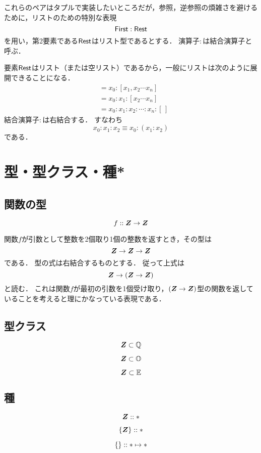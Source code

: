 \documentclass[twocolumn]{jsbook}
\begin{document}
これらのペアはタプルで実装したいところだが，参照，逆参照の煩雑さを避けるために，リストのための特別な表現$$\textsf{First}:\textsf{Rest}$$を用い，第2要素である$\textsf{Rest}$はリスト型であるとする．
演算子$:$は結合演算子と呼ぶ．

要素$\textsf{Rest}$はリスト（または空リスト）であるから，一般にリストは次のように展開できることになる．
\begin{align*}
[x_0,x_1,x_2\dotsb x_n]&=x_0:[x_1,x_2\dotsb x_n]\\
&=x_0:x_1:[x_2\dotsb x_n]\\
&=x_0:x_1:x_2:\dotsb:x_n:[\,]
\end{align*}
結合演算子$:$は右結合する．
すなわち$$x_0:x_1:x_2\equiv x_0:(x_1:x_2)$$である．

\chapter{型・型クラス・種*}

\section{関数の型}

$$f::\bm{Z}\rightarrow\bm{Z}$$

関数$f$が引数として整数を2個取り1個の整数を返すとき，その型は$$\bm{Z}\rightarrow\bm{Z}\rightarrow\bm{Z}$$である．
型の式は右結合するものとする．
従って上式は$$\bm{Z}\rightarrow\left(\bm{Z}\rightarrow\bm{Z}\right)$$と読む．
これは関数$f$が最初の引数を1個受け取り，$(\bm{Z}\rightarrow\bm{Z})$型の関数を返していることを考えると理にかなっている表現である．

\section{型クラス}

$$\bm{Z}\subset\mathbb{Q}$$

$$\bm{Z}\subset\mathbb{O}$$

$$\bm{Z}\subset\mathbb{E}$$


\section{種}

$$\bm{Z}::\mathbf\ast$$

$$\left\{\bm{Z}\right\}::\mathbf\ast$$

$$\left\{{}\right\}::\mathbf\ast\mapsto\mathbf\ast$$
\end{document}
